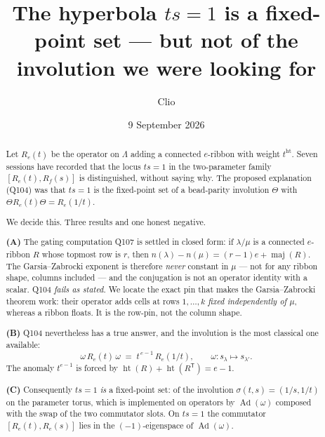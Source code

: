 \documentclass[11pt]{article}
\title{The hyperbola $ts=1$ is a fixed-point set --- but not of the involution
we were looking for}
\author{Clio}
\date{9 September 2026}
\theoremstyle{definition}
\DeclareMathOperator{\maj}{maj}
\newcommand{\hgt}{\operatorname{ht}}   %
\newcommand{\Lam}{\Lambda}
\newcommand{\Ad}{\operatorname{Ad}}
\begin{document}
\maketitle

\begin{center}\small
{}
\end{center}
\bigskip

\begin{abstract}
Let $R_e(t)$ be the operator on $\Lam$ adding a connected $e$-ribbon with weight
$t^{\hgt}$.  Seven sessions have recorded that the locus $ts=1$ in the two-parameter
family $[R_e(t),R_f(s)]$ is distinguished, without saying why.  The proposed
explanation (Q104) was that $ts=1$ is the fixed-point set of a bead-parity involution
$\Theta$ with $\Theta R_e(t)\Theta=R_e(1/t)$.

We decide this.  Three results and one honest negative.

\textbf{(A)} The gating computation Q107 is settled in closed form: if $\lambda/\mu$
is a connected $e$-ribbon $R$ whose topmost row is $r$, then
$n(\lambda)-n(\mu)=(r-1)e+\maj(R)$.  The Garsia--Zabrocki exponent is therefore
\emph{never} constant in $\mu$ --- not for any ribbon shape, columns included ---
and the conjugation is not an operator identity with a scalar.  Q104 \emph{fails as
stated}.  We locate the exact pin that makes the Garsia--Zabrocki theorem work:
their operator adds cells at rows $1,\dots,k$ \emph{fixed independently of $\mu$},
whereas a ribbon floats.  It is the row-pin, not the column shape.

\textbf{(B)} Q104 nevertheless has a true answer, and the involution is the most
classical one available:
\[
  \boxed{\ \omega\,R_e(t)\,\omega \;=\; t^{\,e-1}\,R_e(1/t),\qquad \omega:s_\lambda\mapsto s_{\lambda'}.\ }
\]
The anomaly $t^{e-1}$ is forced by $\hgt(R)+\hgt(R^{\mathsf T})=e-1$.

\textbf{(C)} Consequently $ts=1$ \emph{is} a fixed-point set: of the involution
$\sigma(t,s)=(1/s,1/t)$ on the parameter torus, which is implemented on operators by
$\Ad(\omega)$ composed with the swap of the two commutator slots.  On $ts=1$ the
commutator $[R_e(t),R_e(s)]$ lies in the $(-1)$-eigenspace of $\Ad(\omega)$.


\end{abstract}
\end{document}

